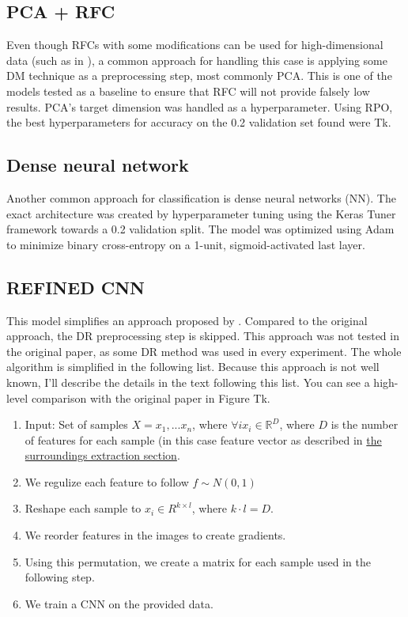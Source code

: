 \subsection{PCA + RFC}

Even though RFCs with some modifications can be used for high-dimensional data (such as in \cite{Genuer}), a common approach for handling this case is applying some DM technique as a preprocessing step, most commonly PCA. This is one of the models tested as a baseline to ensure that RFC will not provide falsely low results. PCA's target dimension was handled as a hyperparameter. Using RPO, the best hyperparameters for accuracy on the 0.2 validation set found were Tk.

\subsection{Dense neural network}

Another common approach for classification is dense neural networks (NN). The exact architecture was created by hyperparameter tuning using the Keras Tuner framework towards a 0.2 validation split. The model was optimized using Adam to minimize binary cross-entropy on a 1-unit, sigmoid-activated last layer.

\subsection{REFINED CNN}

This model simplifies an approach proposed by \cite{REFINED}. Compared to the original approach, the DR preprocessing step is skipped. This approach was not tested in the original paper, as some DR method was used in every experiment. The whole algorithm is simplified in the following list. Because this approach is not well known, I'll describe the details in the text following this list. You can see a high-level comparison with the original paper in Figure Tk.

\begin{enumerate}
    \item Input: Set of samples $X = x_1, ... x_n$, where $\forall i x_i \in \mathbb{R}^{D}$, where $D$ is the number of features for each sample (in this case feature vector as described in \hyperref[Surroundings]{the surroundings extraction section}.
    \item We regulize each feature to follow $f \sim N(0,1)$
    \item Reshape each sample to $x_i \in R^{k\times l}$, where $k\cdot l = D$.
    \item We reorder features in the images to create gradients.
    \item Using this permutation, we create a matrix for each sample used in the following step.
    \item We train a CNN on the provided data.
\end{enumerate}

